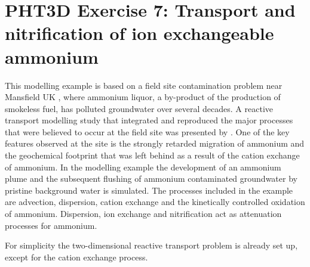 \section[PHT3D Exercise 7: Transport and nitrification of ion exchangeable ammonium]{PHT3D Exercise 7: Transport and nitrification of ion exchangeable ammonium}

This modelling example is based on a field site contamination problem near
Mansfield UK \citep[see, e.g.,][]{broholm98, phddavison,jones1998, davison2000,
jones2001}, where ammonium liquor, a by-product of the production
of smokeless fuel, has polluted groundwater over several decades.
A reactive transport modelling study that integrated 
and reproduced the major processes that were believed to occur at the
field site was presented by \cite{haerens_phd}. 
One of the key features observed at the site is the
strongly retarded migration of ammonium and the geochemical footprint that
was left behind as a result of the cation exchange of ammonium.  
In the modelling example the development of an ammonium plume
and the subsequent flushing of ammonium contaminated groundwater by
pristine background water is simulated.  The processes included in
the example are advection, dispersion, cation exchange
and the kinetically controlled oxidation of ammonium.
Dispersion, ion exchange and nitrification act as attenuation 
processes for ammonium.

For simplicity the two-dimensional reactive transport problem is already set up, except for the 
cation exchange process. 



